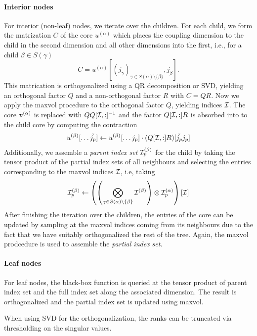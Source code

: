 \documentclass[a4wide]{article}
\begin{document}
\paragraph{Interior nodes}
For interior (non-leaf) nodes, we iterate over the children.
For each child, we form the matrization $C$ of the core $u^{(\alpha)}$ which places the coupling dimension to the child in the second dimension and all other dimensions into the first, i.e., for a child $\beta \in S(\gamma)$
\begin{equation*}
  C = u^{(\alpha)}[(j_\gamma)_{\gamma \in S(\alpha) \setminus \{\beta\}}, j_{\beta}].
\end{equation*}
This matrication is orthogonalized using a QR decomposition or SVD, yielding an orthogonal factor $Q$ and a non-orthogonal factor $R$ with $C = QR$.
Now we apply the maxvol procedure to the orthogonal factor $Q$, yielding indices $\mathcal{I}$.
The core ${\boldsymbol{v}}^{(\alpha)}$ is replaced with $Q Q[\mathcal{I}, :]^{-1}$ and the factor $Q[\mathcal{I}, :] R$ is absorbed into  to the child core by computing the contraction
\begin{equation*}
  u^{(\beta)}[\dots \tilde{j_p}] \leftarrow u^{(\beta)}[\dots j_p] \cdot (Q[\mathcal{I}, :] R)[\tilde{j_p} j_p]
\end{equation*}
Additionally, we assemble a \emph{parent index set} $\mathcal{I}_p^{(\beta)}$ for the
child by taking the tensor product of the partial index sets of all neighbours
and selecting the entries corresponding to the maxvol indices $\mathcal{I}$, i.e, taking
\begin{equation*}
  \mathcal{I}_p^{(\beta)} \leftarrow 
  \left( \left(\bigotimes_{\gamma \in S(\alpha) \setminus \{\beta\}} 
  \mathcal{I}^{(\beta)} \right) \otimes \mathcal{I}_p^{(\alpha)} \right) [\mathcal{I}]
\end{equation*}
After finishing the iteration over the children, the entries of the core can be updated by sampling at
the maxvol indices coming from its neighbours due to the fact that we have suitably orthogonalized the rest
of the tree. 
Again, the maxvol prodcedure is used to assemble the \emph{partial index set}.

\paragraph{Leaf nodes}
For leaf nodes, the black-box function is queried at the tensor product of parent index set and the full index set along the associated dimension.
The result is orthogonalized and the partial index set is updated using maxvol.

\begin{remark}
  When using SVD for the orthogonalization, the ranks can be truncated via thresholding on the singular values.
\end{remark}
\end{document}
